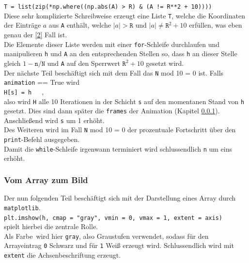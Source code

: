 \documentclass[12pt]{scrartcl}
\newcommand\tab[1][1cm]{\hspace*{#1}}
\begin{document}
\tab \texttt{T = list(zip(*np.where((np.abs(A) > R) \& (A != R**2 + 10))))}\\

Diese sehr komplizierte Schreibweise erzeugt eine Liste \texttt{T}, welche die Koordinaten der Einträge $a$ aus \texttt{A} enthält, welche $|a| > \texttt{R}$ und $|a| \neq \texttt{R}^2 + 10$ erfüllen, was eben genau der \ref{2} Fall ist.\\

Die Elemente dieser Liste werden mit einer \texttt{for}-Schleife durchlaufen und manipulieren \texttt{h} und \texttt{A} an den entsprechenden Stellen so, dass \texttt{h} an dieser Stelle gleich $1 - \texttt{n}/\texttt{N}$ und \texttt{A} auf den Sperrwert $\texttt{R}^2 + 10$ gesetzt wird.\\

Der nächste Teil beschäftigt sich mit dem Fall das \texttt{N} mod 10 = 0 ist. Falls \texttt{animation} == True wird\\

\tab \texttt{H[s] = h}~~~,\\

also wird \texttt{H} alle 10 Iterationen in der Schicht \texttt{s} auf den momentanen Stand von \texttt{h} gesetzt. Dies sind dann später die \texttt{frames} der Animation (Kapitel \ref{Vom_Array_zum_Bild}). Anschließend wird \texttt{s} um 1 erhöht.\\

Des Weiteren wird im Fall \texttt{N} mod 10 = 0 der prozentuale Fortschritt über den \texttt{print}-Befehl ausgegeben.\\

Damit die \texttt{while}-Schleife irgenwann terminiert wird schlussendlich \texttt{n} um eins erhöht.

\subsubsection{Vom Array zum Bild}\label{Vom_Array_zum_Bild}
Der nun folgenden Teil beschäftigt sich mit der Darstellung eines Array durch \texttt{matplotlib}.\\

\tab \texttt{plt.imshow(h, cmap = "gray", vmin = 0, vmax = 1, extent = axis)}\\

spielt hierbei die zentrale Rolle.\\
Als \glqq Farbe\grqq ~wird hier \texttt{gray}, also Graustufen verwendet, sodass für den Arrayeintrag \texttt{0} Schwarz und für \texttt{1} Weiß erzeugt wird. Schlussendlich wird mit \texttt{extent} die Achsenbeschriftung erzeugt.\\
\end{document}
